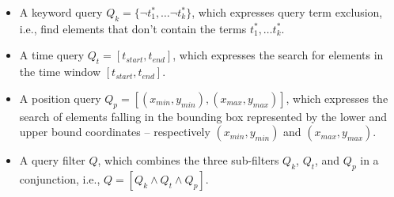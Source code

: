 \begin{itemize}
\item A keyword query $Q_k=\{\neg t_{1}^{*},\dots \neg t_{k}^{*}\}$, which expresses query term exclusion, i.e., find elements that don't contain the terms $t_{1}^{*},\dots t_{k}^{*}$.
\item  A time query $Q_t=[t_{start},t_{end}]$, which expresses the search for elements in the time window $[t_{start},t_{end}]$.
\item A position query $Q_p=[(x_{min},y_{min}),(x_{max},y_{max})]$, which expresses the search of elements falling in the bounding box represented by the  lower and upper bound coordinates -- respectively $(x_{min},y_{min})$ and $(x_{max},y_{max})$.
\item A query filter $Q$, which combines the three sub-filters $Q_k$, $Q_t$, and $Q_p$ in a conjunction, i.e., $Q=[Q_k\wedge Q_t\wedge Q_p]$. 

\end{itemize}










